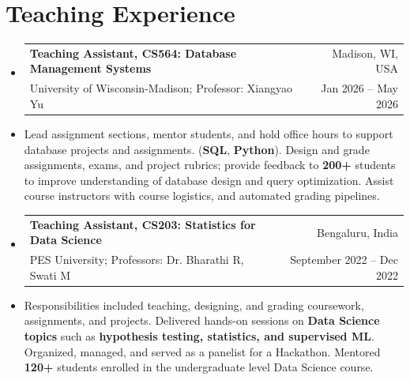 \documentclass[letterpaper,11pt]{article}
\makeatletter
\newcommand{\resumeItem}[1]{
  \item\small{
    {#1 \vspace{-2pt}}
  }
}
\newcommand{\resumeSubheading}[4]{
  \vspace{-2pt}\item
    \begin{tabular*}{0.97\textwidth}[t]{l@{\extracolsep{\fill}}r}
      \textbf{#1} & #2 \\
      \small#3 & \small #4 \\
    \end{tabular*}\vspace{-7pt}
}
\newcommand{\resumeSubHeadingListStart}{\begin{itemize}[leftmargin=0.15in, label={}]}
\newcommand{\resumeSubHeadingListEnd}{\end{itemize}}
\makeatother
\begin{document}

        

\section{Teaching Experience}
\resumeSubHeadingListStart
    \resumeSubheading
      {Teaching Assistant, CS564: Database Management Systems}{Madison, WI, USA} 
      {University of Wisconsin-Madison; Professor: Xiangyao Yu}{Jan 2026 -- May 2026}
      
      \resumeItem{Lead assignment sections, mentor students, and hold office hours to support database projects and assignments. (\textbf{SQL}, \textbf{Python}). Design and grade assignments, exams, and project rubrics; provide feedback to \textbf{200+} students to improve understanding of database design and query optimization. Assist course instructors with course logistics, and automated grading pipelines.}
    
    \resumeSubheading
      {Teaching Assistant, CS203: Statistics for Data Science}{Bengaluru, India} 
      {PES University; Professors: Dr. Bharathi R, Swati M}{September 2022 -- Dec 2022}
      
      \resumeItem{Responsibilities included teaching, designing, and grading coursework, assignments, and projects. Delivered hands-on sessions on \textbf{{Data Science topics}} such as \textbf{{hypothesis testing, statistics, and supervised ML}}. Organized, managed, and served as a panelist for a Hackathon. Mentored \textbf{120+} students enrolled in the undergraduate level Data Science course.}
    
  \resumeSubHeadingListEnd
  

\end{document}
